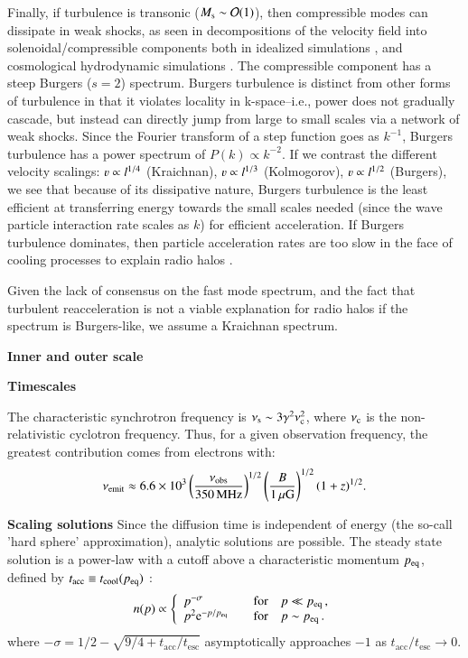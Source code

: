 \documentclass[fleqn,usenatbib,useAMS]{mnras}
\begin{document}
Finally, if turbulence is transonic ($M_{\rm s} \sim {\mathcal O}(1)$), then compressible modes can dissipate in weak shocks, as seen in decompositions of the velocity field into solenoidal/compressible components both in idealized simulations \citep{kowal10,porter15}, and cosmological hydrodynamic simulations \citep{miniati15}. The compressible component has a steep Burgers ($s=2$) spectrum. Burgers turbulence is distinct from other forms of turbulence in that it violates locality in k-space--i.e., power does not gradually cascade, but instead can directly jump from large to small scales via a network of weak shocks. Since the Fourier transform of a step function goes as $k^{-1}$, Burgers turbulence has a power spectrum of $P(k) \propto k^{-2}$. If we contrast the different velocity scalings: $\varv \propto l^{1/4}$ (Kraichnan), $\varv \propto l^{1/3}$ (Kolmogorov), $\varv \propto l^{1/2}$ (Burgers), we see that because of its dissipative nature, Burgers turbulence is the least efficient at transferring energy towards the small scales needed (since the wave particle interaction rate scales as $k$) for efficient acceleration. If Burgers turbulence dominates, then particle acceleration rates are too slow in the face of cooling processes to explain radio halos \citep{miniati15}.

Given the lack of consensus on the fast mode spectrum, and the fact that turbulent reacceleration is not a viable explanation for radio halos if the spectrum is Burgers-like, we assume a Kraichnan spectrum. 

{\bf Inner and outer scale}

{\bf Timescales} 

The characteristic synchrotron frequency is $\nu_{\rm s} \sim 3 \gamma^{2} \nu_{\rm c}^{2}$, where $\nu_{\rm c}$ is the non-relativistic cyclotron frequency. Thus, for a given observation frequency, the greatest contribution comes from electrons with: 
\begin{equation}
\nu_{\rm emit} \approx 6.6 \times 10^{3} \left( \frac{\nu_{\rm obs}}{350 \, {\rm MHz}} \right)^{1/2} \left(\frac{B}{1 \, \mu{\rm G}} \right)^{1/2} (1+z)^{1/2}.
\end{equation}  

{\bf Scaling solutions} Since the diffusion time is independent of energy (the so-call 'hard sphere' approximation), analytic solutions are possible. The steady state solution is a power-law with a cutoff above a characteristic momentum $p_{\rm eq}$, defined by $t_{\rm acc} \equiv t_{\rm cool} (p_{\rm eq})$ \citep{stawarz08}: 
\begin{equation}
n(p) \propto \left \{
\begin{array}{ll}
p^{-\sigma} & \quad \text{for} \quad p \ll p_{\text{eq}} \, , \\
p^2 {\rm e}^{-p/p_{\text{eq}}} & \quad \text{for} \quad p \sim p_{\text{eq}} \,.
\end{array}
\right.
\end{equation}
%
where $-\sigma = 1/2 - \sqrt{9/4 +
  t_\text{acc}/t_\text{esc}}$ asymptotically approaches $-1$
as $t_\text{acc}/t_\text{esc} \rightarrow 0$.
\end{document}
